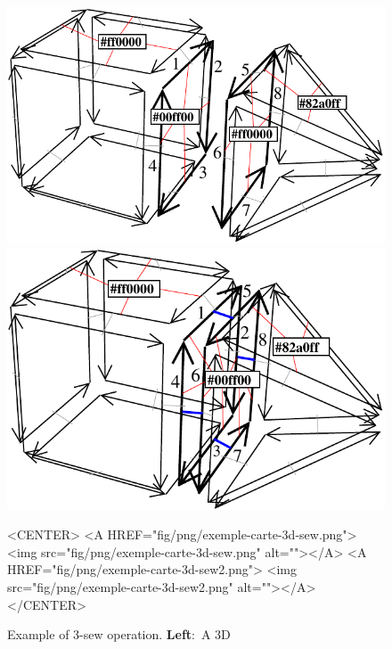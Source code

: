 \def\LargFig{.45\textwidth}
\begin{figure}
  \begin{ccTexOnly}
    \begin{center}
      \includegraphics[width=\LargFig]{Combinatorial_map/fig/pdf/exemple-carte-3d-sew}\qquad
      \includegraphics[width=\LargFig]{Combinatorial_map/fig/pdf/exemple-carte-3d-sew2}
    \end{center}
  \end{ccTexOnly}
  \begin{ccHtmlOnly}
    <CENTER> <A HREF="fig/png/exemple-carte-3d-sew.png"> <img
    src="fig/png/exemple-carte-3d-sew.png" alt=""></A> <A
    HREF="fig/png/exemple-carte-3d-sew2.png"> <img
    src="fig/png/exemple-carte-3d-sew2.png" alt=""></A> </CENTER>
  \end{ccHtmlOnly}
  \caption{Example of 3-sew operation. \textbf{Left}:~A 3D
}
\end{figure}

